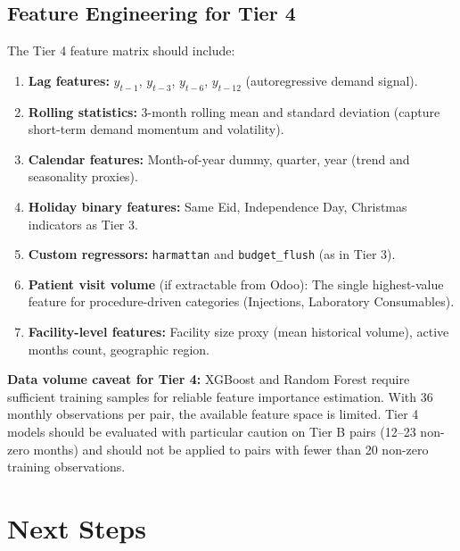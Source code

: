 \documentclass[12pt, a4paper]{article}
\begin{document}
\subsection{Feature Engineering for Tier 4}

The Tier 4 feature matrix should include:

\begin{enumerate}[leftmargin=1.5em, itemsep=4pt]
  \item \textbf{Lag features:} $y_{t-1}$, $y_{t-3}$, $y_{t-6}$,
        $y_{t-12}$ (autoregressive demand signal).
  \item \textbf{Rolling statistics:} 3-month rolling mean and standard
        deviation (capture short-term demand momentum and volatility).
  \item \textbf{Calendar features:} Month-of-year dummy, quarter,
        year (trend and seasonality proxies).
  \item \textbf{Holiday binary features:} Same Eid, Independence Day,
        Christmas indicators as Tier 3.
  \item \textbf{Custom regressors:} \texttt{harmattan} and
        \texttt{budget\_flush} (as in Tier 3).
  \item \textbf{Patient visit volume} (if extractable from Odoo):
        The single highest-value feature for procedure-driven categories
        (Injections, Laboratory Consumables).
  \item \textbf{Facility-level features:} Facility size proxy (mean
        historical volume), active months count, geographic region.
\end{enumerate}

\begin{mdframed}[style=warnbox]
\textbf{Data volume caveat for Tier 4:} XGBoost and Random Forest
require sufficient training samples for reliable feature importance
estimation. With 36 monthly observations per pair, the available
feature space is limited. Tier 4 models should be evaluated with
particular caution on Tier B pairs (12--23 non-zero months) and should
not be applied to pairs with fewer than 20 non-zero training observations.
\end{mdframed}

\section{Next Steps}
\label{sec:next}
\end{document}
